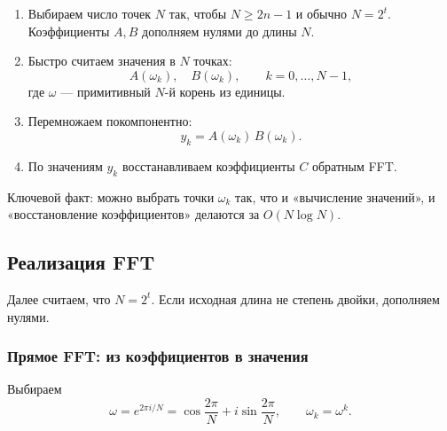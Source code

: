 \begin{enumerate}
	\item Выбираем число точек $N$ так, чтобы $N\ge 2n-1$ и обычно $N=2^t$.
	Коэффициенты $A,B$ дополняем нулями до длины $N$.
	\item Быстро считаем значения в $N$ точках:
	\[
	A(\omega_k),\quad B(\omega_k), \qquad k=0,\dots,N-1,
	\]
	где $\omega$ — примитивный $N$-й корень из единицы.
	\item Перемножаем покомпонентно:
	\[
	y_k = A(\omega_k)\,B(\omega_k).
	\]
	\item По значениям $y_k$ восстанавливаем коэффициенты $C$ обратным FFT.
\end{enumerate}

Ключевой факт: можно выбрать точки $\omega_k$ так, что и «вычисление значений»,
и «восстановление коэффициентов» делаются за $O(N\log N)$.

\subsection*{Реализация FFT}

Далее считаем, что $N=2^t$. Если исходная длина не степень двойки,
дополняем нулями.

\subsubsection*{Прямое FFT: из коэффициентов в значения}

Выбираем
\[
\omega = e^{2\pi i/N}=\cos\frac{2\pi}{N}+i\sin\frac{2\pi}{N},
\qquad
\omega_k=\omega^k.
\]


